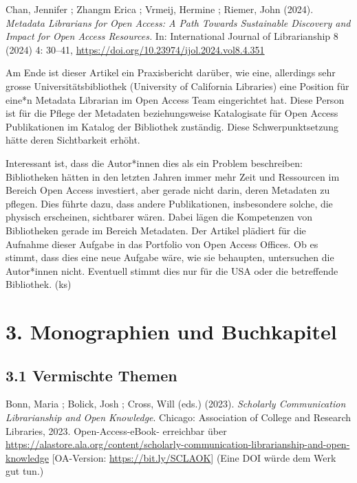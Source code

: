 \documentclass[a4paper,
fontsize=11pt,
oneside,
numbers=noperiodatend,
parskip=half-,
bibliography=totoc,
final
]{scrartcl}
\begin{document}
Chan, Jennifer ; Zhangm Erica ; Vrmeij, Hermine ; Riemer, John (2024).
\emph{Metadata Librarians for Open Access: A Path Towards Sustainable
Discovery and Impact for Open Access Resources.} In: International
Journal of Librarianship 8 (2024) 4: 30--41,
\url{https://doi.org/10.23974/ijol.2024.vol8.4.351}

Am Ende ist dieser Artikel ein Praxisbericht darüber, wie eine,
allerdings sehr grosse Universitätsbibliothek (University of California
Libraries) eine Position für eine*n Metadata Librarian im Open Access
Team eingerichtet hat. Diese Person ist für die Pflege der Metadaten
beziehungsweise Katalogisate für Open Access Publikationen im Katalog
der Bibliothek zuständig. Diese Schwerpunktsetzung hätte deren
Sichtbarkeit erhöht.

Interessant ist, dass die Autor*innen dies als ein Problem beschreiben:
Bibliotheken hätten in den letzten Jahren immer mehr Zeit und Ressourcen
im Bereich Open Access investiert, aber gerade nicht darin, deren
Metadaten zu pflegen. Dies führte dazu, dass andere Publikationen,
insbesondere solche, die physisch erscheinen, sichtbarer wären. Dabei
lägen die Kompetenzen von Bibliotheken gerade im Bereich Metadaten. Der
Artikel plädiert für die Aufnahme dieser Aufgabe in das Portfolio von
Open Access Offices. Ob es stimmt, dass dies eine neue Aufgabe wäre, wie
sie behaupten, untersuchen die Autor*innen nicht. Eventuell stimmt dies
nur für die USA oder die betreffende Bibliothek. (ks)

\hypertarget{monographien-und-buchkapitel}{%
\section{3. Monographien und
Buchkapitel}\label{monographien-und-buchkapitel}}

\hypertarget{vermischte-themen-1}{%
\subsection{3.1 Vermischte Themen}\label{vermischte-themen-1}}

Bonn, Maria ; Bolick, Josh ; Cross, Will (eds.) (2023). \emph{Scholarly
Communication Librarianship and Open Knowledge}. Chicago: Association of
College and Research Libraries, 2023. Open-Access-eBook- erreichbar über
\url{https://alastore.ala.org/content/scholarly-communication-librarianship-and-open-knowledge}
{[}OA-Version: \url{https://bit.ly/SCLAOK}{]} (Eine DOI würde dem Werk
gut tun.)
\end{document}
